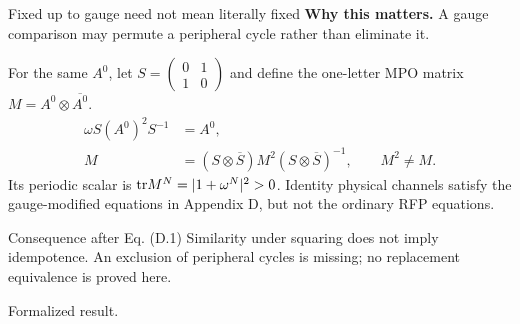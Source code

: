 \documentclass[aspectratio=169,14pt]{beamer}
\newcommand{\why}[1]{\textcolor{amber}{\textbf{Why this matters.}} #1\par\medskip}
\newcommand{\verified}{\textcolor{mintgreen}{Formalized result.}}
\begin{document}
\begin{frame}{Fixed up to gauge need not mean literally fixed}
\why{A gauge comparison may permute a peripheral cycle rather than eliminate it.}
For the same $A^0$, let $S=\left(\begin{smallmatrix}0&1\\1&0\end{smallmatrix}\right)$ and define the one-letter MPO matrix $M=A^0\otimes\overline{A^0}$.
\begin{align*}
 \omega S(A^0)^2S^{-1}&=A^0,\\
 M&=(S\otimes\overline S)M^2(S\otimes\overline S)^{-1},\qquad M^2\ne M.
\end{align*}
Its periodic scalar is $\mathrm{tr} M^N=|1+\omega^N|^2>0$.
Identity physical channels satisfy the gauge-modified equations in Appendix D, but not the ordinary RFP equations.
\begin{block}{Consequence after Eq. (D.1)}
Similarity under squaring does not imply idempotence. An exclusion of peripheral cycles is missing; no replacement equivalence is proved here.
\end{block}
\verified
\end{frame}
\end{document}
